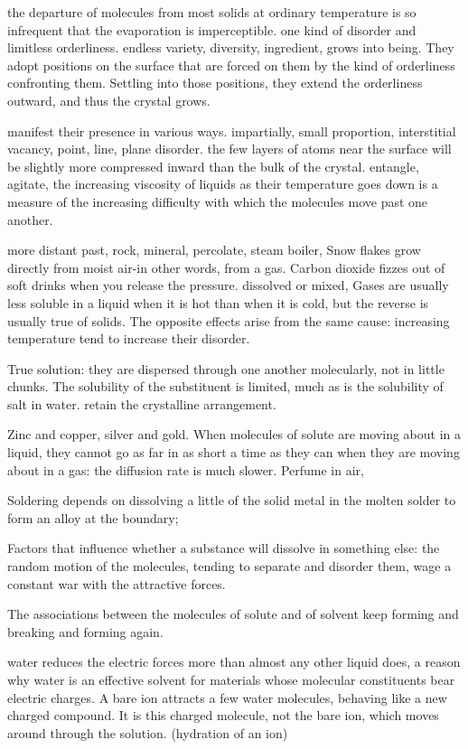 the departure of molecules from most solids at ordinary temperature is so infrequent that the evaporation is imperceptible. 
one kind of disorder and limitless orderliness. endless variety, diversity, ingredient, grows into being. They adopt positions on the surface that are forced on them by the kind of orderliness confronting them. Settling into those positions, they extend the orderliness outward, and thus the crystal grows. 

manifest their presence in various ways. impartially, small proportion, interstitial vacancy, point, line, plane disorder. the few layers of atoms near the surface will be slightly more compressed  inward than the bulk of the crystal. entangle, agitate, the increasing viscosity of liquids as their temperature goes down is a measure of the increasing difficulty with which the molecules move past one another. 

more distant past, rock, mineral, percolate, steam boiler, 
Snow flakes grow directly from moist air-in other words, from a gas. Carbon dioxide fizzes out of soft drinks when you release the pressure. dissolved or mixed, 
Gases are usually less soluble in a liquid when it is hot than when it is cold, but the reverse is usually true of solids. The opposite effects arise from the same cause: increasing temperature tend to increase their disorder. 

True solution: they are dispersed through one another molecularly, not in little chunks. 
The solubility of the substituent is limited, much as is the solubility of salt in water. retain the crystalline arrangement. 

Zinc and copper, silver and gold. 
When molecules of solute are moving about in a liquid, they cannot go as far in as short a time as they can when they are moving about in a gas: the diffusion rate is much slower. Perfume in air, 

Soldering depends on dissolving a little of the solid metal in the molten solder to form an alloy at the boundary; 

Factors that influence whether a substance will dissolve in something else: the random motion of the molecules, tending to separate and disorder them, wage a constant war with the attractive forces.  

The associations between the molecules of solute and of solvent keep forming and breaking and forming again. 

water reduces the electric forces more than almost any other liquid does, a reason why water is an effective solvent for materials whose molecular constituents bear electric charges.  A bare ion attracts a few water molecules, behaving like a new charged compound. It is this charged molecule, not the bare ion, which moves around through the solution. (hydration of an ion) 

